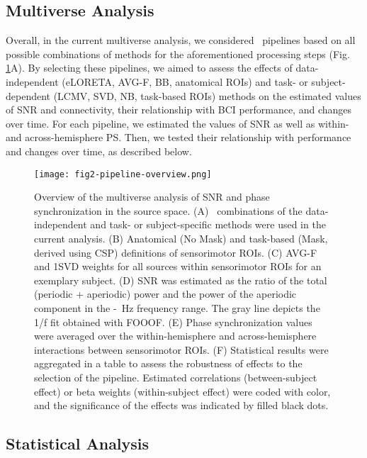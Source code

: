 \subsection{Multiverse Analysis}

Overall, in the current multiverse analysis, we considered \numPipelines~pipelines based on all possible combinations of methods for the aforementioned processing steps (Fig. \ref{fig:pipeline_overview}A). By selecting these pipelines, we aimed to assess the effects of data-independent (eLORETA, AVG-F, BB, anatomical ROIs) and task- or subject-dependent (LCMV, SVD, NB, task-based ROIs) methods on the estimated values of SNR and connectivity, their relationship with BCI performance, and changes over time. For each pipeline, we estimated the values of SNR as well as within- and across-hemisphere PS. Then, we tested their relationship with performance and changes over time, as described below.

\begin{figure}[htbp]
    \centering
    \texttt{[image: fig2-pipeline-overview.png]}
    \caption{Overview of the multiverse analysis of SNR and phase synchronization in the source space. (A) \numPipelines~combinations of the data-independent and task- or subject-specific methods were used in the current analysis. (B) Anatomical (No Mask) and task-based (Mask, derived using CSP) definitions of sensorimotor ROIs. (C) AVG-F and 1SVD weights for all sources within sensorimotor ROIs for an exemplary subject. (D) SNR was estimated as the ratio of the total (periodic + aperiodic) power and the power of the aperiodic component in the \muLow-\muHigh~Hz frequency range. The gray line depicts the 1/f fit obtained with FOOOF. (E) Phase synchronization values were averaged over the within-hemisphere and across-hemisphere interactions between sensorimotor ROIs. (F) Statistical results were aggregated in a table to assess the robustness of effects to the selection of the pipeline. Estimated correlations (between-subject effect) or beta weights (within-subject effect) were coded with color, and the significance of the effects was indicated by filled black dots.}
    \label{fig:pipeline_overview}
\end{figure}

\subsection{Statistical Analysis}

